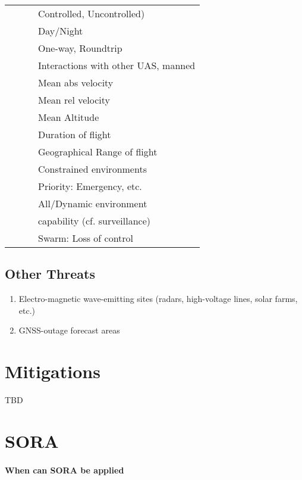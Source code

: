 \documentclass{ua_wgs_base}
\begin{document}
\begin{centering}
\begin{longtable}{|l|l|l|l|}
   & & & Controlled, Uncontrolled) \\\cline{4-4}
   & & & Day/Night \\\cline{4-4}
   & & & One-way, Roundtrip \\\cline{4-4}
   & & & Interactions with other UAS, manned \\\cline{4-4}
   & & & Mean abs velocity \\\cline{4-4}
   & & & Mean rel velocity \\\cline{4-4}
   & & & Mean Altitude \\\cline{4-4}
   & & & Duration of flight \\\cline{4-4}
   & & & Geographical Range of flight \\\cline{4-4}
   & & & Constrained environments \\\cline{4-4}
   & & & Priority: Emergency, etc. \\\cline{4-4}
   & & & All/Dynamic environment \\
   & & & capability (cf. surveillance) \\\cline{4-4}
   & & & Swarm: Loss of control \\\cline{1-4}

\hline
\end{longtable}
\end{centering}


\subsection{Other Threats}
\begin{enumerate}
\item Electro-magnetic wave-emitting sites (radars, high-voltage lines,
solar farms, etc.) 
\item GNSS-outage forecast areas
\end{enumerate}

\section{Mitigations}

TBD

\section{SORA}

\paragraph{When can SORA be applied}
\end{document}
